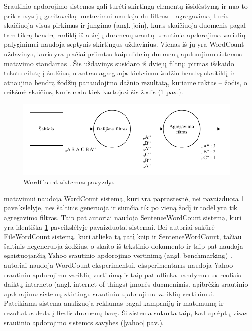 \documentclass{VUMIFPSbakalaurinis}
\begin{document}
Srautinio apdorojimo sistemos gali turėti skirtingą elementų išsidėstymą ir nuo to priklausys jų greitaveiką. \cite{Karimov2018BenchmarkingDS} matavimui naudoja du filtrus – agregavimo, kuris skaičiuoja visus pirkimus ir jungimo (angl. join), kuris skaičiuoja duomenis pagal tam tikrą bendrą rodiklį iš abiejų duomenų srautų. \cite{Qian2016Benchmarking} srautinio apdorojimo variklių palyginimui naudoja septynis skirtingus uždavinius. Vienas iš jų yra WordCount uždavinys, kuris yra plačiai priimtas kaip didelių duomenų apdorojimo sistemos matavimo standartas \cite{huang2010hibench}. Šis uždavinys susidaro iš dviejų filtrų: pirmas išskaido teksto eilutę į žodžius, o antras agreguoja kiekvieno žodžio bendrą skaitiklį ir atnaujina bendrą žodžių panaudojimo dažnio rezultatą, kuriame raktas – žodis, o reikšmė skaičius, kuris rodo kiek kartojosi šis žodis (\ref{wordcount} pav.). 
\begin{figure}[H]
    \includegraphics[width=15cm]{img/wordcount.pdf}
    \caption{WordCount sistemos pavyzdys}
    \label{wordcount}
\end{figure} 
\cite{zhang2020heron} matavimui naudoja WordCount sistemą, kuri yra paprastesnė, nei pavaizduota \ref{wordcount} paveikslėlyje, nes šaltinis generuoja ir siunčia tik po vieną žodį ir todėl yra tik agregavimo filtras. Taip pat autoriai  naudoja SentenceWordCount sistemą, kuri yra identiška \ref{wordcount} paveikslėlyje pavaizduotai sistemai. Bei autoriai sukūrė FileWordCount sistemą, kuri atlieka tą patį kaip ir SentenceWordCount, tačiau šaltinis negeneruoja žodžius, o skaito iš tekstinio dokumento ir taip pat naudoja egzistuojančią Yahoo srautinio apdorojimo vertinimą (angl. benchmarking) \cite{Chintapalli2016Benchmarking}. \cite{dhalion} autoriai naudoja WordCount eksperimentui. \cite{vaquero2018autotuning} eksperimentams naudoja Yahoo srautinio apdorojimo variklių vertinimą \cite{Chintapalli2016Benchmarking} ir taip pat atlieka bandymus su realiais daiktų interneto (angl. internet of things) įmonės duomenimis. \cite{Chintapalli2016Benchmarking} apibrėžia srautinio apdorojimo sistemą skirtingu srautinio apdorojimo variklių vertinimui. Pateikiama sistema analizuoja reklamas pagal kampaniją ir matomumą ir rezultatus deda į Redis duomenų bazę. Ši sistema sukurta taip, kad aprėptų visas srautinio apdorojimo sistemos savybes (\ref{yahoo} pav.).
\end{document}
